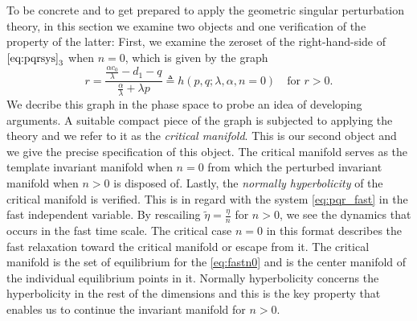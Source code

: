 \documentclass[a4paper,11pt]{article}
\begin{document}
To be concrete and to get prepared to apply the geometric singular perturbation theory, in this section we examine two objects and one verification of the property of the latter: First, we examine the zeroset of the right-hand-side of $\eqref{eq:pqrsys}_3$ when $n=0$, which is given by the graph
$$r=\frac{ \frac{\alpha c_0}{\lambda} - d_1 -q }{ \frac{\alpha}{\lambda} + \lambda p}\triangleq h(p,q;\lambda,\alpha,n=0) \quad \text{for $r>0$}.$$
We decribe this graph in the phase space to probe an idea of developing arguments. A suitable compact piece of the graph is subjected to applying the theory and we refer to it as the {\it critical manifold}. This is our second object and we give the precise specification of this object. The critical manifold serves as the template invariant manifold when $n=0$ from which the perturbed invariant manifold when $n>0$ is disposed of.  Lastly, the {\it normally hyperbolicity} of the critical manifold is verified. This is in regard with the system \eqref{eq:pqr_fast} in the fast independent variable. By rescailing $\tilde\eta=\frac{\eta}{n}$ for $n>0$, we see the dynamics that occurs in the fast time scale. The critical case $n=0$ in this format describes the fast relaxation toward the critical manifold or escape from it. The critical manifold is the set of equilibrium for the \eqref{eq:fastn0} and is the center manifold of the individual equilibrium points in it. Normally hyperbolicity concerns the hyperbolicity in the rest of the dimensions and this is the key property that enables us to continue the invariant manifold for $n>0$.
\end{document}
